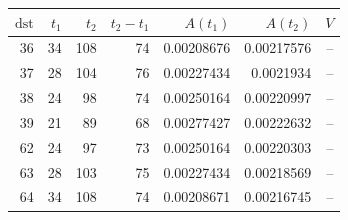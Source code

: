 \begin{tabular}{r r r r r r r}
\toprule
$\mathrm{dst}$ & $t_1$ & $t_2$ & $t_2-t_1$ & $A(t_1)$ & $A(t_2)$ & $V$ \\
\midrule
36 & 34 & 108 & 74 & 0.00208676 & 0.00217576 & -- \\
37 & 28 & 104 & 76 & 0.00227434 & 0.0021934 & -- \\
38 & 24 & 98 & 74 & 0.00250164 & 0.00220997 & -- \\
39 & 21 & 89 & 68 & 0.00277427 & 0.00222632 & -- \\
62 & 24 & 97 & 73 & 0.00250164 & 0.00220303 & -- \\
63 & 28 & 103 & 75 & 0.00227434 & 0.00218569 & -- \\
64 & 34 & 108 & 74 & 0.00208671 & 0.00216745 & -- \\
\bottomrule
\end{tabular}
